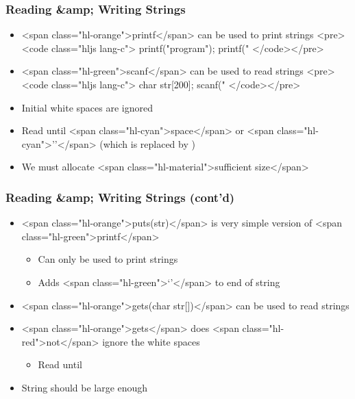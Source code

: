 \documentclass{../c-lecture}
\begin{document}
\begin{frame}
  \frametitle{Reading &amp; Writing Strings}
  \begin{itemize}
    \item <span class="hl-orange">printf</span> can be used to print strings
    <pre><code class="hljs lang-c">
printf("program");
printf("%
    </code></pre>
  \end{itemize}
  \begin{itemize}
    \item <span class="hl-green">scanf</span> can be used to read strings
    <pre><code class="hljs lang-c">
char str[200];
scanf("%
    </code></pre>
    \item Initial white spaces are ignored
    \item
      Read until <span class="hl-cyan">space</span> or
      <span class="hl-cyan">'\n'</span> (which is replaced by \0)

    \item We must allocate <span class="hl-material">sufficient size</span>
  \end{itemize}
\end{frame}
\begin{frame}
  \frametitle{Reading &amp; Writing Strings (cont’d)}
  \begin{itemize}
    \item
      <span class="hl-orange">puts(str)</span> is very simple version of
      <span class="hl-green">printf</span>

    \begin{itemize}
      \item Can only be used to print strings
      \item Adds <span class="hl-green">‘\n’</span> to end of string
    \end{itemize}
    \item
      <span class="hl-orange">gets(char str[])</span> can be used to read
      strings

    \item
      <span class="hl-orange">gets</span> does
      <span class="hl-red">not</span> ignore the white spaces

    \begin{itemize}
      \item Read until \n
    \end{itemize}
    \item String should be large enough
  \end{itemize}
\end{frame}
\end{document}
